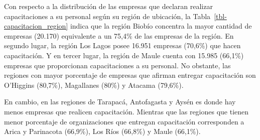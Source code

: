 \documentclass[
  11pt,
]{article}
\begin{document}
Con respecto a la distribución de las empresas que declaran realizar
capacitaciones a su personal según su región de ubicación, la
Tabla~\ref{tbl-capacitacion_region} indica que la región Biobío
concentra la mayor cantidad de empresas (20.170) equivalente a un 75,4\%
de las empresas de la región. En segundo lugar, la región Los Lagos
posee 16.951 empresas (70,6\%) que hacen capacitación. Y en tercer
lugar, la región de Maule cuenta con 15.985 (66,1\%) empresas que
proporcionan capacitaciones a su personal. No obstante, las regiones con
mayor porcentaje de empresas que afirman entregar capacitación son
O'Higgins (80,7\%), Magallanes (80\%) y Atacama (79,6\%).

En cambio, en las regiones de Tarapacá, Antofagasta y Aysén es donde hay
menos empresas que realicen capacitación. Mientras que las regiones que
tienen menor porcentaje de organizaciones que entregan capacitación
corresponden a Arica y Parinacota (66,9\%), Los Ríos (66,8\%) y Maule
(66,1\%).
\end{document}
